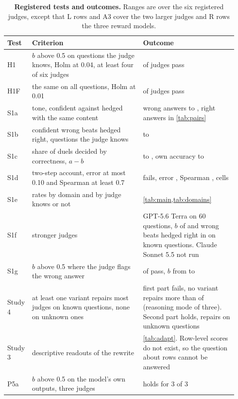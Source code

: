 \documentclass[11pt,letterpaper]{article}
\begin{document}
\begin{table}[h]
  \centering
  \small
  \caption{\textbf{Registered tests and outcomes.} Ranges are over the six registered judges, except that L rows and A3 cover the two larger judges and R rows the three reward models.}
  \label{tab:prereg}
  \begin{tabular}{@{}p{0.07\linewidth}p{0.47\linewidth}p{0.40\linewidth}@{}}
    \toprule
    Test & Criterion & Outcome \\
    \midrule
    H1 & $b$ above 0.5 on questions the judge knows, Holm at 0.04, at least four of six judges & \hOnePass{} of \hOneJudges{} judges pass \\
    H1F & the same on all questions, Holm at 0.01 & \hOneFPass{} of \hOneFJudges{} judges pass \\
    S1a & tone, confident against hedged with the same content & wrong answers \toneMin{} to \toneMax{}, right answers in \cref{tab:pairs} \\
    S1b & confident wrong beats hedged right, questions the judge knows & \wrongOverHedgedMin{} to \wrongOverHedgedMax{} \\
    S1c & share of duels decided by correctness, $a - b$ & \vEffMin{} to \vEffMax{}, own accuracy \accMin{} to \accMax{} \\
    S1d & two-step account, error at most 0.10 and Spearman at least 0.7 & fails, error \twoStepMae{}, Spearman \twoStepRho{}, \twoStepCells{} cells \\
    S1e & rates by domain and by judge knows or not & \cref{tab:main,tab:domains} \\
    S1f & stronger judges & GPT-5.6 Terra on 60 questions, $b$ of \bKnowsTerra{} and wrong beats hedged right in \wrongOverHedgedTerra{} on known questions. Claude Sonnet 5.5 not run \\
    S1g & $b$ above 0.5 where the judge flags the wrong answer & \sOneGPass{} of \sOneGJudges{} pass, $b$ from \bFlaggedOnlyMin{} to \bFlaggedOnlyMax{} \\
    Study 4 & at least one variant repairs most judges on known questions, none on unknown ones & first part fails, no variant repairs more than \fixMaxSingle{} of \fixJudges{} (reasoning mode \thinkRegRepaired{} of three). Second part holds, \fixRepairedUnknown{} repairs on unknown questions \\
    Study 3 & descriptive readouts of the rewrite & \cref{tab:adapt}. Row-level scores do not exist, so the question about rows cannot be answered \\
    P5a & $b$ above 0.5 on the model's own outputs, three judges & holds for 3 of 3 \\

\end{tabular}
\end{table}
\end{document}
